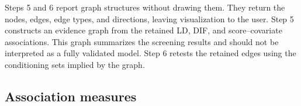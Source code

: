 \documentclass[12pt]{article}
\theoremstyle{examplestyle}
\begin{document}
Steps 5 and 6 report graph structures without drawing them. They return the nodes, edges, edge types, and directions, leaving visualization to the user. Step 5 constructs an evidence graph from the retained LD, DIF, and score--covariate associations. This graph summarizes the screening results and should not be interpreted as a fully validated model. Step 6 retests the retained edges using the conditioning sets implied by the graph.

\newpage


\newpage

\begin{appendices}
\section{}\label{sec:AppGeneral}

\end{appendices}

\begin{appendices}
\section{Association measures}\label{sec:App-gamma}
%

\end{appendices}

\begin{appendices}
\section{}\label{sec:App-multiple-testing}

\end{appendices}

\begin{appendices}
\section{}\label{sec:AppAlgorithms}

\end{appendices}
\end{document}

